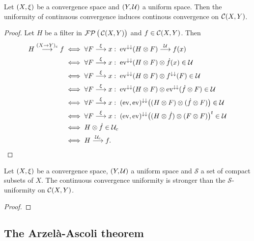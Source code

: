 \begin{lemma}
Let $\left( X, \xi \right)$ be a convergence space and $\left( Y, \mathcal{U} \right)$ a uniform space. Then the uniformity of continuous convergence induces continous convergence on $\operatorname{\mathcal{C}}(X,Y)$.
\end{lemma}
\begin{proof}
Let $H$ be a filter in $\operatorname{\mathcal{FP}}\big(\operatorname{\mathcal{C}}(X,Y)\big)$ and $f\in \operatorname{\mathcal{C}}(X, Y)$. Then
\begin{align*}
H\overset{(X\to Y)_c}{\longrightarrow} f &\iff \forall F\overset{\xi}{\longrightarrow}x: \; \operatorname{ev}^{\downarrow\downarrow}(H\otimes F) \overset{\mathcal{U}}{\longrightarrow} f(x) \\
&\iff \forall F\overset{\xi}{\longrightarrow}x: \; \operatorname{ev}^{\downarrow\downarrow}(H\otimes F)\otimes \dot{f}(x) \in\mathcal{U} \\
&\iff \forall F\overset{\xi}{\longrightarrow}x: \; \operatorname{ev}^{\downarrow\downarrow}(H\otimes F)\otimes f^{\downarrow\downarrow}(F) \in\mathcal{U} \\
&\iff \forall F\overset{\xi}{\longrightarrow}x: \; \operatorname{ev}^{\downarrow\downarrow}(H\otimes F)\otimes \operatorname{ev}^{\downarrow\downarrow}(\dot{f}\otimes F) \in\mathcal{U} \\
&\iff \forall F\overset{\xi}{\longrightarrow}x: \; (\operatorname{ev}, \operatorname{ev})^{\downarrow\downarrow}\big((H\otimes F)\otimes (\dot{f}\otimes F)\big) \in\mathcal{U} \\
&\iff \forall F\overset{\xi}{\longrightarrow}x: \; (\operatorname{ev}, \operatorname{ev})^{\downarrow\downarrow}\big((H\otimes \dot{f})\otimes (F \otimes F)\big)^t \in\mathcal{U} \\
&\iff H\otimes \dot{f}\in \mathcal{U}_c \\
&\iff H\overset{\mathcal{U}_c}{\longrightarrow} f.
\end{align*}
\end{proof}

\begin{proposition}
Let $\left( X, \xi \right)$ be a convergence space, $\left( Y, \mathcal{U} \right)$ a uniform space and $\mathcal{S}$ a set of compact subsets of $X$. The continuous convergence uniformity is stronger than the $\mathcal{S}$-uniformity on $\operatorname{\mathcal{C}}(X,Y)$.
\end{proposition}
\begin{proof}

\end{proof}

\subsection{The Arzelà-Ascoli theorem}


